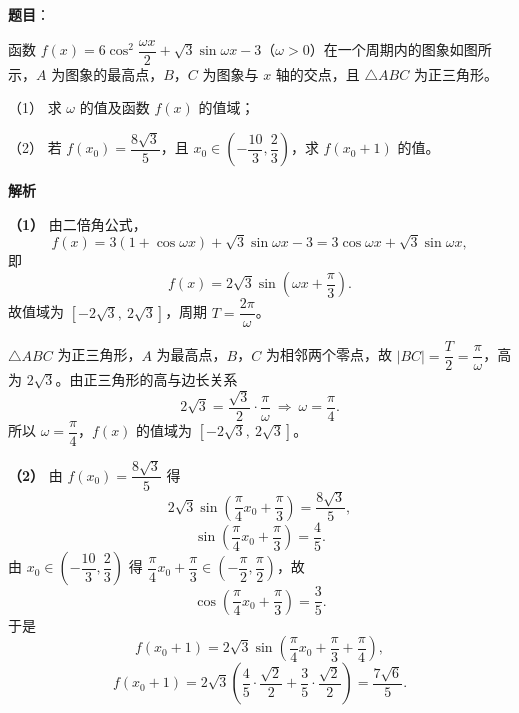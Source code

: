 \begin{answer}

\textbf{题目}：

函数 $f(x)=6\cos^2\dfrac{\omega x}{2}+\sqrt3\sin\omega x-3$（$\omega>0$）在一个周期内的图象如图所示，$A$ 为图象的最高点，$B$，$C$ 为图象与 $x$ 轴的交点，且 $\triangle ABC$ 为正三角形。

（1） 求 $\omega$ 的值及函数 $f(x)$ 的值域；

（2） 若 $f(x_0)=\dfrac{8\sqrt3}{5}$，且 $x_0\in\left(-\dfrac{10}3,\dfrac23\right)$，求 $f(x_0+1)$ 的值。
\nopagebreak[4]
\begin{center}\end{center}
\nopagebreak[4]
\textbf{解析}

\textbf{（1）} 由二倍角公式，
\nopagebreak[4]
\[f(x)=3\left(1+\cos\omega x\right)+\sqrt3\sin\omega x-3=3\cos\omega x+\sqrt3\sin\omega x,\]
即
\nopagebreak[4]
\[f(x)=2\sqrt3\sin\left(\omega x+\frac\pi3\right).\]
故值域为 $\left[-2\sqrt3,\ 2\sqrt3\right]$，周期 $T=\dfrac{2\pi}\omega$。

$\triangle ABC$ 为正三角形，$A$ 为最高点，$B$，$C$ 为相邻两个零点，故 $|BC|=\dfrac T2=\dfrac\pi\omega$，高为 $2\sqrt3$。由正三角形的高与边长关系
\nopagebreak[4]
\[2\sqrt3=\frac{\sqrt3}2\cdot\frac\pi\omega\ \Longrightarrow\ \omega=\frac\pi4.\]
所以 $\omega=\dfrac\pi4$，$f(x)$ 的值域为 $\left[-2\sqrt3,\ 2\sqrt3\right]$。

\textbf{（2）} 由 $f(x_0)=\dfrac{8\sqrt3}5$ 得
\nopagebreak[4]
\[2\sqrt3\sin\left(\frac\pi4x_0+\frac\pi3\right)=\frac{8\sqrt3}5,\]
\nopagebreak[4]
\[\sin\left(\frac\pi4x_0+\frac\pi3\right)=\frac45.\]
由 $x_0\in\left(-\dfrac{10}3,\dfrac23\right)$ 得 $\dfrac\pi4x_0+\dfrac\pi3\in\left(-\dfrac\pi2,\dfrac\pi2\right)$，故
\nopagebreak[4]
\[\cos\left(\frac\pi4x_0+\frac\pi3\right)=\frac35.\]
于是
\nopagebreak[4]
\[f(x_0+1)=2\sqrt3\sin\left(\frac\pi4x_0+\frac\pi3+\frac\pi4\right),\]
\nopagebreak[4]
\[f(x_0+1)=2\sqrt3\left(\frac45\cdot\frac{\sqrt2}2+\frac35\cdot\frac{\sqrt2}2\right)=\frac{7\sqrt6}5.\]



\end{answer}
